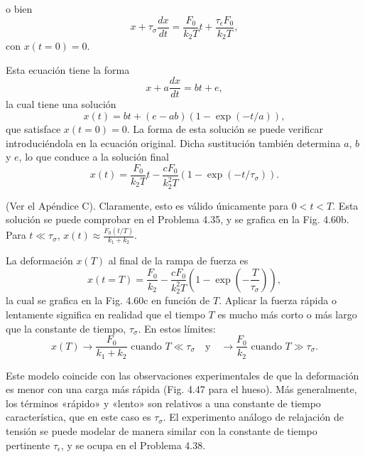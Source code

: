 \documentclass[12pt]{book}
\begin{document}
o bien
\begin{equation}
x + \tau_{\sigma} \frac{dx}{dt} = \frac{F_0}{k_2 T} t + \frac{\tau_{\epsilon} F_0}{k_2 T},
\label{eq:4.72}
\end{equation}
con $x(t = 0) = 0$.

Esta ecuación tiene la forma
\begin{equation}
x + a\frac{dx}{dt} = bt + e,
\label{eq:4.73}
\end{equation}
la cual tiene una solución
\begin{equation}
x(t) = bt + (e - ab)(1 - \exp(-t/a)),
\label{eq:4.74}
\end{equation}
que satisface $x(t = 0) = 0$. La forma de esta solución se puede verificar introduciéndola en la ecuación original. Dicha sustitución también determina $a$, $b$ y $e$, lo que conduce a la solución final
\begin{equation}
x(t) = \frac{F_0}{k_2 T} t - \frac{c F_0}{k_2^2 T} (1 - \exp(-t/\tau_{\sigma})).
\label{eq:4.75}
\end{equation}

(Ver el Apéndice C). Claramente, esto es válido únicamente para $0 < t < T$. Esta solución se puede comprobar en el Problema 4.35, y se grafica en la Fig. 4.60b. Para $t \ll \tau_{\sigma}$, $x(t) \approx \frac{F_0(t/T)}{k_1 + k_2}$.

La deformación $x(T)$ al final de la rampa de fuerza es
\begin{equation}
x(t = T) = \frac{F_0}{k_2} - \frac{c F_0}{k_2^2 T} \left( 1 - \exp\left(-\frac{T}{\tau_{\sigma}}\right) \right),
\label{eq:4.76}
\end{equation}
la cual se grafica en la Fig. 4.60c en función de $T$. Aplicar la fuerza rápida o lentamente significa en realidad que el tiempo $T$ es mucho más corto o más largo que la constante de tiempo, $\tau_{\sigma}$. En estos límites:
\begin{equation}
x(T) \to \frac{F_0}{k_1 + k_2} \text{ cuando } T \ll \tau_{\sigma} \quad \text{y} \quad \to \frac{F_0}{k_2} \text{ cuando } T \gg \tau_{\sigma}.
\label{eq:4.77}
\end{equation}

Este modelo coincide con las observaciones experimentales de que la deformación es menor con una carga más rápida (Fig. 4.47 para el hueso). Más generalmente, los términos «rápido» y «lento» son relativos a una constante de tiempo característica, que en este caso es $\tau_{\sigma}$. El experimento análogo de relajación de tensión se puede modelar de manera similar con la constante de tiempo pertinente $\tau_{\epsilon}$, y se ocupa en el Problema 4.38.
\end{document}
